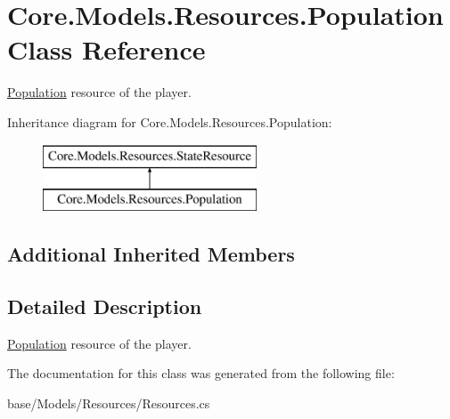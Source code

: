 \hypertarget{classCore_1_1Models_1_1Resources_1_1Population}{}\section{Core.\+Models.\+Resources.\+Population Class Reference}
\label{classCore_1_1Models_1_1Resources_1_1Population}


\hyperlink{classCore_1_1Models_1_1Resources_1_1Population}{Population} resource of the player.  


Inheritance diagram for Core.\+Models.\+Resources.\+Population\+:\begin{figure}[H]
\begin{center}
\leavevmode
\includegraphics[height=2.000000cm]{classCore_1_1Models_1_1Resources_1_1Population}
\end{center}
\end{figure}
\subsection*{Additional Inherited Members}


\subsection{Detailed Description}
\hyperlink{classCore_1_1Models_1_1Resources_1_1Population}{Population} resource of the player. 



The documentation for this class was generated from the following file\+:\begin{DoxyCompactItemize}
\item 
base/\+Models/\+Resources/Resources.\+cs\end{DoxyCompactItemize}
